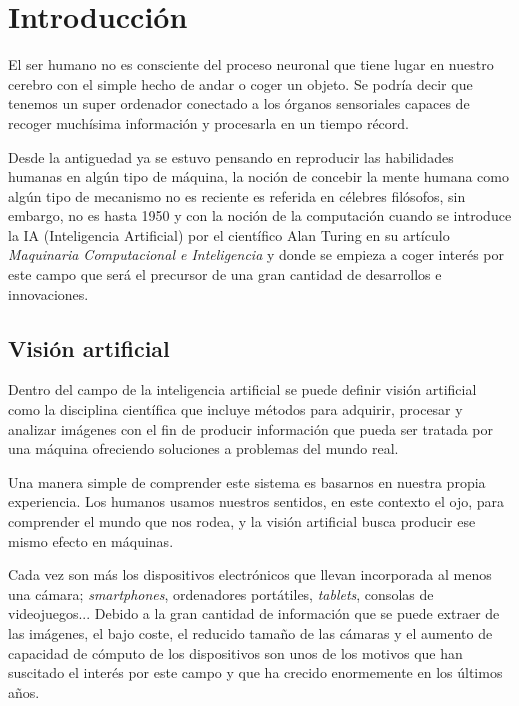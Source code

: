 
\chapter{Introducción} %

\label{Chapter1} %

El ser humano no es consciente del proceso neuronal que tiene lugar en nuestro cerebro con el simple hecho de andar o coger un objeto. Se podría decir que tenemos un super ordenador conectado a los órganos sensoriales capaces de recoger muchísima información y procesarla en un tiempo récord.

Desde la antiguedad ya se estuvo pensando en reproducir las habilidades humanas en algún tipo de máquina, la noción de concebir la mente humana como algún tipo de mecanismo no es reciente es referida en célebres filósofos, sin embargo, no es hasta 1950 y con la noción de la computación cuando se introduce la IA (Inteligencia Artificial) por el científico Alan Turing en su artículo \textit{Maquinaria Computacional e Inteligencia} y donde se empieza a coger interés por este campo que será el precursor de una gran cantidad de desarrollos e innovaciones.

\section{Visión artificial}

Dentro del campo de la inteligencia artificial se puede definir visión artificial como la disciplina científica que incluye métodos para adquirir, procesar y analizar imágenes con el fin de producir información que pueda ser tratada por una máquina ofreciendo soluciones a problemas del mundo real.

Una manera simple de comprender este sistema es basarnos en nuestra propia experiencia. Los humanos usamos nuestros sentidos, en este contexto el ojo, para comprender el mundo que nos rodea, y la visión artificial busca producir ese mismo efecto en máquinas.

Cada vez son más los dispositivos electrónicos que llevan incorporada al menos una cámara; \textit{smartphones}, ordenadores portátiles, \textit{tablets}, consolas de videojuegos... Debido a la gran cantidad de información que se puede extraer de las imágenes, el bajo coste, el reducido tamaño de las cámaras y el aumento de capacidad de cómputo de los dispositivos son unos de los motivos que han suscitado el interés por este campo y que ha crecido enormemente en los últimos años.




